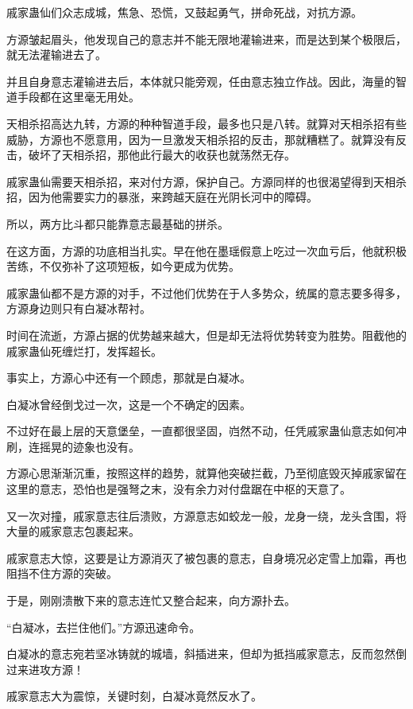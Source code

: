 
\begin{this_body}

戚家蛊仙们众志成城，焦急、恐慌，又鼓起勇气，拼命死战，对抗方源。

方源皱起眉头，他发现自己的意志并不能无限地灌输进来，而是达到某个极限后，就无法灌输进去了。

并且自身意志灌输进去后，本体就只能旁观，任由意志独立作战。因此，海量的智道手段都在这里毫无用处。

天相杀招高达九转，方源的种种智道手段，最多也只是八转。就算对天相杀招有些威胁，方源也不愿意用，因为一旦激发天相杀招的反击，那就糟糕了。就算没有反击，破坏了天相杀招，那他此行最大的收获也就荡然无存。

戚家蛊仙需要天相杀招，来对付方源，保护自己。方源同样的也很渴望得到天相杀招，因为他需要实力的暴涨，来跨越天庭在光阴长河中的障碍。

所以，两方比斗都只能靠意志最基础的拼杀。

在这方面，方源的功底相当扎实。早在他在墨瑶假意上吃过一次血亏后，他就积极苦练，不仅弥补了这项短板，如今更成为优势。

戚家蛊仙都不是方源的对手，不过他们优势在于人多势众，统属的意志要多得多，方源身边则只有白凝冰帮衬。

时间在流逝，方源占据的优势越来越大，但是却无法将优势转变为胜势。阻截他的戚家蛊仙死缠烂打，发挥超长。

事实上，方源心中还有一个顾虑，那就是白凝冰。

白凝冰曾经倒戈过一次，这是一个不确定的因素。

不过好在最上层的天意堡垒，一直都很坚固，岿然不动，任凭戚家蛊仙意志如何冲刷，连摇晃的迹象也没有。

方源心思渐渐沉重，按照这样的趋势，就算他突破拦截，乃至彻底毁灭掉戚家留在这里的意志，恐怕也是强弩之末，没有余力对付盘踞在中枢的天意了。

又一次对撞，戚家意志往后溃败，方源意志如蛟龙一般，龙身一绕，龙头含围，将大量的戚家意志包裹起来。

戚家意志大惊，这要是让方源消灭了被包裹的意志，自身境况必定雪上加霜，再也阻挡不住方源的突破。

于是，刚刚溃散下来的意志连忙又整合起来，向方源扑去。

“白凝冰，去拦住他们。”方源迅速命令。

白凝冰的意志宛若坚冰铸就的城墙，斜插进来，但却为抵挡戚家意志，反而忽然倒过来进攻方源！

戚家意志大为震惊，关键时刻，白凝冰竟然反水了。


\end{this_body}
